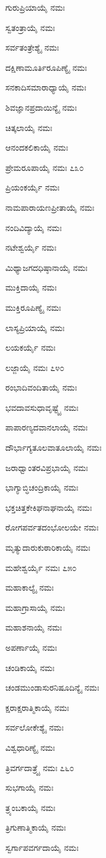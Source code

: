 ಗುರುಪ್ರಿಯಾಯೈ ನಮಃ

ಸ್ವತಂತ್ರಾಯೈ ನಮಃ

ಸರ್ವತಂತ್ರೇಶ್ಯೈ ನಮಃ

ದಕ್ಷಿಣಾಮೂರ್ತಿರೂಪಿಣ್ಯೈ ನಮಃ

ಸನಕಾದಿಸಮಾರಾಧ್ಯಾಯೈ ನಮಃ

ಶಿವಜ್ಞಾನಪ್ರದಾಯಿನ್ಯೈ ನಮಃ

ಚಿತ್ಕಲಾಯೈ ನಮಃ

ಆನಂದಕಲಿಕಾಯೈ ನಮಃ

ಪ್ರೇಮರೂಪಾಯೈ ನಮಃ \num{೭೩೦}

ಪ್ರಿಯಂಕರ್ಯೈ ನಮಃ

ನಾಮಪಾರಾಯಣಪ್ರೀತಾಯೈ ನಮಃ

ನಂದಿವಿದ್ಯಾಯೈ ನಮಃ

ನಟೇಶ್ವರ್ಯೈ ನಮಃ

ಮಿಥ್ಯಾಜಗದಧಿಷ್ಠಾನಾಯೈ ನಮಃ

ಮುಕ್ತಿದಾಯೈ ನಮಃ

ಮುಕ್ತಿರೂಪಿಣ್ಯೈ ನಮಃ

ಲಾಸ್ಯಪ್ರಿಯಾಯೈ ನಮಃ 

ಲಯಕರ್ಯೈ ನಮಃ

ಲಜ್ಜಾಯೈ ನಮಃ \num{೭೪೦}

ರಂಭಾದಿವಂದಿತಾಯೈ ನಮಃ

ಭವದಾವಸುಧಾವೃಷ್ಟ್ಯೈ ನಮಃ

ಪಾಪಾರಣ್ಯದವಾನಲಾಯೈ ನಮಃ

ದೌರ್ಭಾಗ್ಯತೂಲವಾತೂಲಾಯೈ ನಮಃ

ಜರಾಧ್ವಾಂತರವಿಪ್ರಭಾಯೈ ನಮಃ

ಭಾಗ್ಯಾಬ್ಧಿಚಂದ್ರಿಕಾಯೈ ನಮಃ

ಭಕ್ತಚಿತ್ತಕೇಕಿಘನಾಘನಾಯೈ ನಮಃ

ರೋಗಪರ್ವತದಂಭೋಲಯೇ ನಮಃ

ಮೃತ್ಯುದಾರುಕುಠಾರಿಕಾಯೈ ನಮಃ

ಮಹೇಶ್ವರ್ಯೈ ನಮಃ \num{೭೫೦}

ಮಹಾಕಾಲ್ಯೈ ನಮಃ

ಮಹಾಗ್ರಾಸಾಯೈ ನಮಃ

ಮಹಾಶನಾಯೈ ನಮಃ

ಅಪರ್ಣಾಯೈ ನಮಃ

ಚಂಡಿಕಾಯೈ ನಮಃ

ಚಂಡಮುಂಡಾಸುರನಿಷೂದಿನ್ಯೈ ನಮಃ

ಕ್ಷರಾಕ್ಷರಾತ್ಮಿಕಾಯೈ ನಮಃ

ಸರ್ವಲೋಕೇಶ್ಯೈ ನಮಃ

ವಿಶ್ವಧಾರಿಣ್ಯೈ ನಮಃ

ತ್ರಿವರ್ಗದಾತ್ರ್ಯೈ ನಮಃ \num{೭೬೦}

ಸುಭಗಾಯೈ ನಮಃ

ತ್ರ್ಯಂಬಕಾಯೈ ನಮಃ

ತ್ರಿಗುಣಾತ್ಮಿಕಾಯೈ ನಮಃ

ಸ್ವರ್ಗಾಪವರ್ಗದಾಯೈ ನಮಃ

